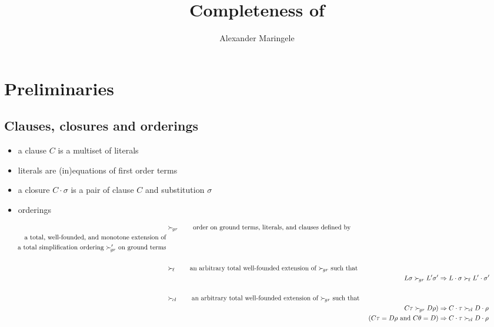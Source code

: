 \documentclass[%
handout,
]{beamer}
\title[Completeness]{Completeness of }
\author[{A$\ell$M}]{%
	Alexander Maringele
}
\institute[UIBK]{%
	{alexander.maringele@gmail.com}
}
\begin{document}
\titleframe

\begin{frame}
    \nocite{GK2004csl}
    
    
\end{frame}

\begin{frame}
    
\end{frame}


\section{Preliminaries}

\subsection{Clauses, closures and orderings}

\begin{frame}

    \begin{itemize}
        \item a clause $C$ is a multiset of literals
        \item literals are (in)equations of first order terms
        \item a closure $C\cdot\sigma$ is a pair of clause $C$ and substitution $\sigma$
        \item orderings
    \end{itemize}
    \begin{align*}
        &\succG
        \tag*{order on ground terms, literals, and clauses defined by}
        \\
        \tag*{a total, well-founded, and monotone extension of}
        \\
        \tag*{a total simplification ordering $\succG'$ on ground terms}
        \\
        \\
        &\succL
        \tag*{an arbitrary total well-founded extension of $\succG$ such that}
        \\
        && L\sigma\succG L'\sigma' &\Rightarrow L\cdot\sigma\succL L'\cdot\sigma'\tag*{}
        \\
        \\
        &\succC \tag*{an arbitrary total well-founded extension of $\succG$ such that }
        \\
        && C\tau\succG D\rho\text)
        &\Rightarrow C\cdot\tau\succC D\cdot\rho   \tag*{}
        \\
        && (C\tau=D\rho\text{ and }C\theta = D)
        &\Rightarrow C\cdot\tau\succC D\cdot\rho   \tag*{}
    \end{align*}
\end{frame}
\end{document}
